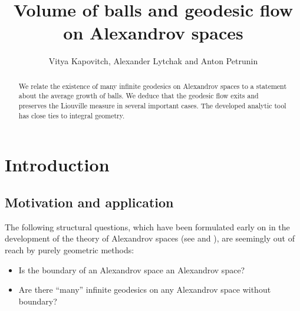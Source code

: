 \documentclass[12pt,leqno,intlimits]{amsart}
\numberwithin{equation}{section}
\theoremstyle{definition}
\theoremstyle{remark}
\begin{document}
\pagebreak
%


\title{Volume of balls and geodesic flow  on Alexandrov spaces}

\author{Vitya Kapovitch, Alexander Lytchak and Anton Petrunin}







\begin{abstract}
 We relate the existence of many infinite geodesics on Alexandrov spaces to a statement about the average growth of balls. We deduce that the geodesic flow exits and preserves the Liouville measure in several important cases. The developed analytic tool has close ties  to integral geometry.
\end{abstract}


\maketitle
\renewcommand{\theequation}{\arabic{section}.\arabic{equation}}


\section{Introduction}
\subsection{Motivation and application}
The following structural questions, which  have been formulated early on in the development of   the theory of Alexandrov spaces (see \cite{BGP} and \cite{P2}), are seemingly out of reach by purely geometric methods:
\begin{itemize}
\item Is the boundary of an Alexandrov space an Alexandrov space?
\item Are there  ``many'' infinite geodesics on any Alexandrov space without boundary?
\end{itemize}
\end{document}
